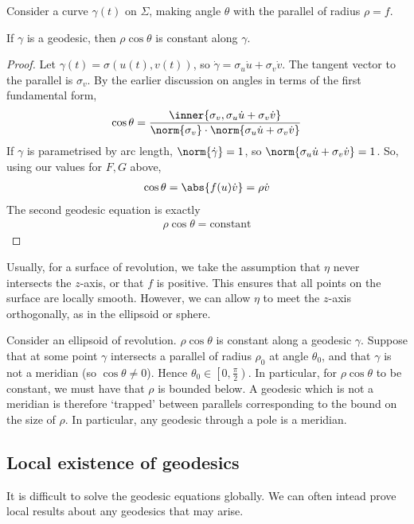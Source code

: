 Consider a curve $\gamma(t)$ on $\Sigma$, making angle $\theta$ with the parallel of radius $\rho = f$.
\begin{proposition}
	If $\gamma$ is a geodesic, then $\rho \cos \theta$ is constant along $\gamma$.
\end{proposition}
\begin{proof}
	Let $\gamma(t) = \sigma(u(t),v(t))$, so $\dot\gamma = \sigma_u \dot u + \sigma_v \dot v$.
	The tangent vector to the parallel is $\sigma_v$.
	By the earlier discussion on angles in terms of the first fundamental form,
	\begin{align*}
		\cos \theta = \frac{\inner{\sigma_v, \sigma_u \dot u + \sigma_v \dot v}}{\norm{\sigma_v} \cdot \norm{\sigma_u \dot u + \sigma_v \dot v}}
	\end{align*}
	If $\gamma$ is parametrised by arc length, $\norm{\dot \gamma} = 1$, so $\norm{\sigma_u \dot u + \sigma_v \dot v} = 1$.
	So, using our values for $F, G$ above,
	\begin{align*}
		\cos \theta = \abs{f(u) \dot v} = \rho \dot v
	\end{align*}
	The second geodesic equation is exactly
	\begin{align*}
		\rho \cos \theta = \text{constant}
	\end{align*}
\end{proof}
\begin{example}
	Usually, for a surface of revolution, we take the assumption that $\eta$ never intersects the $z$-axis, or that $f$ is positive.
	This ensures that all points on the surface are locally smooth.
	However, we can allow $\eta$ to meet the $z$-axis orthogonally, as in the ellipsoid or sphere.

	Consider an ellipsoid of revolution.
	$\rho \cos \theta$ is constant along a geodesic $\gamma$.
	Suppose that at some point $\gamma$ intersects a parallel of radius $\rho_0$ at angle $\theta_0$, and that $\gamma$ is not a meridian (so $\cos \theta \neq 0$).
	Hence $\theta_0 \in \left[0, \frac{\pi}{2}\right)$.
	In particular, for $\rho \cos \theta$ to be constant, we must have that $\rho$ is bounded below.
	A geodesic which is not a meridian is therefore `trapped' between parallels corresponding to the bound on the size of $\rho$.
	In particular, any geodesic through a pole is a meridian.
\end{example}

\subsection{Local existence of geodesics}
It is difficult to solve the geodesic equations globally.
We can often intead prove local results about any geodesics that may arise.


